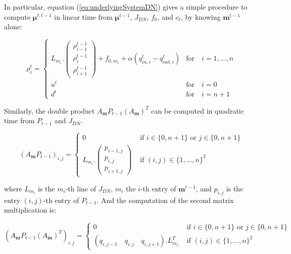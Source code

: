 \documentclass[11pt]{article}
\numberwithin{equation}{section}
\numberwithin{figure}{section}
\numberwithin{table}{section}
\begin{document}

In particular, equation (\ref{eq:underlyingSystemDN}) gives a simple procedure to compute $\boldsymbol\mu^{t:t-1}$ in linear time from $\boldsymbol\mu^{t-1}$, $J_{DN}$, $f_{0}$, and $c_{t}$, by knowing $\boldsymbol m^{t-1}$ alone:

\begin{equation}
\rho^{t}_{i} = \begin{cases}
L_{m_{i}}.\left( \begin{array}{c}
\rho^{t-1}_{i-1}\\
\rho^{t-1}_{i}\\
\rho^{t-1}_{i+1}
\end{array} \right)
+ f_{0,m_{i}} + \alpha(q^{t}_{in,i}-q^{t}_{out,i}) & \text{for}\quad i=1,...,n\\
u^{t} & \text{for}\quad i=0\\
d^{t} & \text{for}\quad i=n+1
\end{cases}
\label{eq:underlyingSystemDNcopy}
\end{equation}

\noindent Similarly, the double product $A_{\boldsymbol m}P_{t-1}(A_{\boldsymbol m})^{T}$ can be computed in quadratic time from $P_{t-1}$ and $J_{DN}$.

\begin{equation}
(A_{\boldsymbol m}P_{t-1})_{i,j} = \begin{cases}
0 & \text{ if } i\in\{0,n+1\}\text{ or }j\in\{0,n+1\}\\
L_{m_{i}}.\left( \begin{array}{c}
p_{i-1,j}\\
p_{i,j}\\
p_{i+1,j}
\end{array} \right) & \text{ if } (i,j)\in\{1,...,n\}^{2}
\end{cases}
\label{eq:predictedCovarianceComputation}
\end{equation}

\noindent where $L_{m_{i}}$ is the $m_{i}$-th line of $J_{DN}$, $m_{i}$ the $i$-th entry of $\boldsymbol m^{t-1}$, and $p_{i,j}$ is the entry $(i,j)$-th entry of $P_{t-1}$. And the computation of the second matrix multiplication is:

\begin{equation}
(A_{\boldsymbol m}P_{t-1}(A_{\boldsymbol m})^{T})_{i,j} = \begin{cases}
0 & \text{ if } i\in\{0,n+1\}\text{ or }j\in\{0,n+1\}\\
(q_{i,j-1}\quad q_{i,j}\quad q_{i,j+1}).L_{m_{j}}^{T} & \text{ if } (i,j)\in\{1,...,n\}^{2}
\end{cases}
\label{eq:predictedCovarianceComputation2}
\end{equation}
\end{document}
